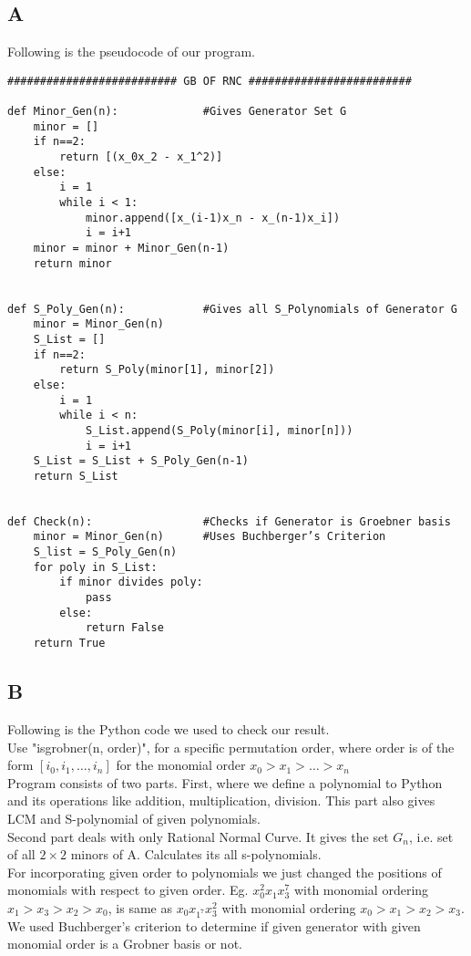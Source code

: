 \documentclass[12pt,a4paper]{article}
\theoremstyle{definition}
\begin{document}
\subsection*{A}
Following is the pseudocode of our program.\\[2cm]
\begin{verbatim}
########################## GB OF RNC #########################

def Minor_Gen(n):             #Gives Generator Set G 
    minor = []
    if n==2:
        return [(x_0x_2 - x_1^2)]
    else:
        i = 1
        while i < 1:
            minor.append([x_(i-1)x_n - x_(n-1)x_i])
            i = i+1
    minor = minor + Minor_Gen(n-1)
    return minor


def S_Poly_Gen(n):            #Gives all S_Polynomials of Generator G  
    minor = Minor_Gen(n)
    S_List = []
    if n==2:
        return S_Poly(minor[1], minor[2])
    else:
        i = 1
        while i < n:
            S_List.append(S_Poly(minor[i], minor[n]))
            i = i+1
    S_List = S_List + S_Poly_Gen(n-1)
    return S_List


def Check(n):                 #Checks if Generator is Groebner basis 
    minor = Minor_Gen(n)      #Uses Buchberger’s Criterion 
    S_list = S_Poly_Gen(n)
    for poly in S_List:
        if minor divides poly:
            pass
        else:
            return False
    return True
\end{verbatim}

\subsection*{B}
Following is the Python code we used to check our result.\\

\noindent Use "isgrobner(n, order)", for a specific permutation order, where order is of the form $[i_0,i_1, \ldots ,i_n]$ for the monomial order $x_0>x_1> \ldots > x_n$ 
\\
Program consists of two parts. First, where we define a polynomial to Python and its operations like addition, multiplication, division. This part also gives LCM and S-polynomial of given polynomials.\\
Second part deals with only Rational Normal Curve. It gives the set $G_{n}$, i.e. set of all $2\times 2$ minors of A. Calculates its all s-polynomials. 
\\
For incorporating given order to polynomials we just changed the positions of monomials with respect to given order. Eg. $x_{0}^2x_{1}x_{3}^7$ with monomial ordering $x_{1}>x_{3}>x_{2}>x_{0}$, is same as $x_{0}x_{1^7}x_{3}^2$ with monomial ordering $x_{0}>x_{1}>x_{2}>x_{3}$.\\
We used Buchberger's criterion to determine if given generator with given monomial order is a Grobner basis or not. 
   
\end{document}
